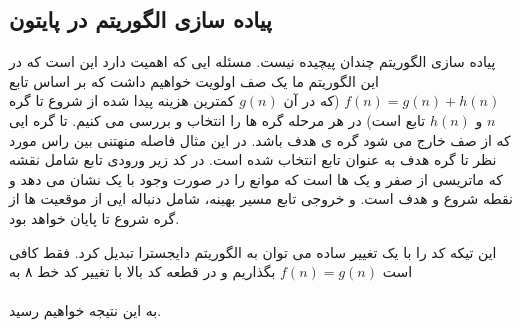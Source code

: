 \subsection{پیاده سازی الگوریتم 
در پایتون
}
پیاده سازی الگوریتم
چندان پیچیده نیست. مسئله ایی که اهمیت دارد این است که در این الگوریتم ما یک صف اولویت خواهیم داشت که بر اساس تابع 
$f(n) = g(n) + h(n)$
(که در آن 
$g(n)$
کمترین هزینه پیدا شده از شروع تا گره 
$n$
و 
$h(n)$
 تابع
 است) در هر مرحله گره ها را انتخاب و بررسی می کنیم. تا گره ایی که از صف خارج می شود گره ی هدف باشد. در این مثال فاصله منهتنی بین راس مورد نظر تا گره هدف به عنوان تابع
 انتخاب شده است. در کد زیر ورودی تابع شامل نقشه که ماتریسی از صفر و یک ها است که موانع را در صورت وجود با یک نشان می دهد و نقطه شروع و هدف است. و خروجی تابع مسیر بهینه، شامل دنباله ایی از موقعیت ها از گره شروع تا پایان خواهد بود.
\begin{latin}
\end{latin}
این تیکه کد را با یک تغییر ساده می توان به الگوریتم دایجسترا تبدیل کرد. فقط کافی است 
$f(n)=g(n) $
بگذاریم و در قطعه کد بالا  با تغییر کد خط ۸ به 
\\
\\
به این نتیجه خواهیم رسید.
